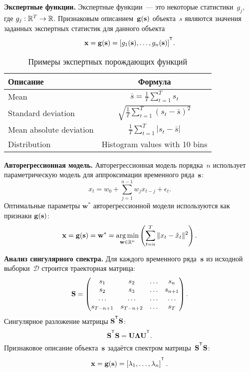 \documentclass[11pt, a5paper]{dissert}
\begin{document}
\textbf{Экспертные функции.}
Экспертные функции~--- это некоторые статистики~$g_j$, где $g_j: \mathbb{R}^T \rightarrow \mathbb{R}$.
Признаковым описанием~$\mathbf{g}(\mathbf{s})$ объекта~$s$ являются значения заданных экспертных статистик для данного объекта
\[
	\bx = \mathbf{g}(\bs) = [g_1(\bs), \dots, g_n(\bs)]^{\T}.
\]
\begin{table}[ht]
	\centering
	\caption{Примеры экспертных порождающих функций}
	\begin{tabular}{|l|c|}
		\hline
		\textbf{Описание}    & \textbf{Формула} \\ \hline
		Mean                    & $\bar{s} = \frac{1}{T} \sum_{t=1}^{T} s_t$    \\ \hline
		Standard deviation      & $\sqrt{\frac{1}{T} \sum_{t=1}^{T} (s_t - \bar{s})^2}$    \\ \hline
		Mean absolute deviation & $\frac{1}{T} \sum_{t=1}^{T} |s_t - \bar{s}|$    \\ \hline
		Distribution            &  Histogram values with 10 bins    \\ \hline
	\end{tabular}
	\label{ch6:tbl:expert_functions}
\end{table}

\textbf{Авторегрессионная модель.}
Авторегрессионная модель порядка~$n$ использует параметрическую модель для аппроксимации временного ряда~$\mathbf{s}$:
\begin{equation*}
	x_t = w_0 + \sum_{j=1}^{n-1} w_j x_{t-j} + \epsilon_t.
\end{equation*}
Оптимальные параметры $\mathbf{w}^*$ авторегрессионной модели используются как признаки $\mathbf{g}(\mathbf{s})$:
\begin{equation}
	\mathbf{x} = \mathbf{g}(\mathbf{s}) = \mathbf{w}^* = \mathop{\arg \min}\limits_{\mathbf{w} \in \mathbb{R}^{n}} \left( \sum_{t=n}^{T} \|x_t - \hat{x}_t\|^2\right).
	\label{ch6:eq:autoregressive_description}
\end{equation}

\textbf{Анализ сингулярного спектра.}
Для каждого временного ряда~$\mathbf{s}$ из исходной выборки~$\mathcal{D}$ строится траекторная матрица:
\[
	\mathbf{S} = 
	\begin{pmatrix}
		s_1 & s_2 & \dots & s_n \\
		s_2 & s_3 & \dots & s_{n+1} \\
		\dots & \dots & \dots & \dots \\
		s_{T-n+1} & s_{T-n+2} & \dots & s_T
	\end{pmatrix}.
\]
Сингулярное разложение матрицы $\mathbf{S}^{\T} \mathbf{S}$:
\[
	\bS^{\T} \bS = \bU \boldsymbol{\Lambda} \bU^{\T}.
\]
Признаковое описание объекта~$\mathbf{s}$ задаётся спектром матрицы~$\bS^{\T} \bS$:
\[
	\bx = \mathbf{g}(\bs) = \left[\lambda_1, \dots, \lambda_n\right]^{\T}.
\]
\end{document}
